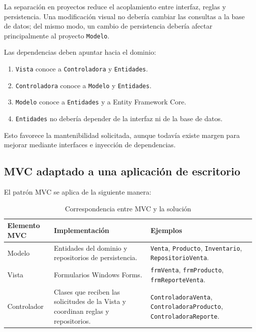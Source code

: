 \documentclass[12pt,a4paper]{article}
\begin{document}
La separación en proyectos reduce el acoplamiento entre interfaz, reglas y
persistencia. Una modificación visual no debería cambiar las consultas a la
base de datos; del mismo modo, un cambio de persistencia debería afectar
principalmente al proyecto \texttt{Modelo}.

Las dependencias deben apuntar hacia el dominio:

\begin{enumerate}
    \item \texttt{Vista} conoce a \texttt{Controladora} y \texttt{Entidades}.
    \item \texttt{Controladora} conoce a \texttt{Modelo} y \texttt{Entidades}.
    \item \texttt{Modelo} conoce a \texttt{Entidades} y a Entity Framework Core.
    \item \texttt{Entidades} no debería depender de la interfaz ni de la base
    de datos.
\end{enumerate}

Esto favorece la mantenibilidad solicitada, aunque todavía existe margen para
mejorar mediante interfaces e inyección de dependencias.

\subsection{MVC adaptado a una aplicación de escritorio}

El patrón MVC se aplica de la siguiente manera:

\begin{table}[H]
\centering
\small
\caption{Correspondencia entre MVC y la solución}
\begin{tabularx}{\textwidth}{L{2.5cm} Y L{4.2cm}}
\toprule
\textbf{Elemento MVC} & \textbf{Implementación} & \textbf{Ejemplos} \\
\midrule
Modelo &
Entidades del dominio y repositorios de persistencia. &
\texttt{Venta}, \texttt{Producto}, \texttt{Inventario},
\texttt{Repositorio\allowbreak Venta}. \\
Vista &
Formularios Windows Forms. &
\texttt{frmVenta}, \texttt{frmProducto},
\texttt{frmReporte\allowbreak Venta}. \\
Controlador &
Clases que reciben las solicitudes de la Vista y coordinan reglas y
repositorios. &
\texttt{Controladora\allowbreak Venta},
\texttt{Controladora\allowbreak Producto},
\texttt{Controladora\allowbreak Reporte}. \\
\bottomrule
\end{tabularx}
\normalsize
\end{table}
\end{document}
